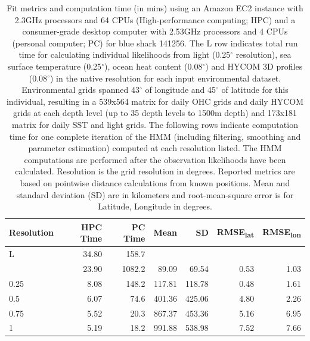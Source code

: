 \begin{table}
\caption[Model fit metrics, grid resolution and computation time]{Fit metrics and computation time (in mins) using an Amazon EC2 instance with 2.3GHz processors and 64 CPUs (High-performance computing; HPC) and a consumer-grade desktop computer with 2.53GHz processors and 4 CPUs (personal computer; PC) for blue shark 141256. The L row indicates total run time for calculating individual likelihoods from light (0.25$^{\circ}$ resolution), sea surface temperature (0.25$^{\circ}$), ocean heat content (0.08$^{\circ}$) and HYCOM 3D profiles (0.08$^{\circ}$) in the native resolution for each input environmental dataset. Environmental grids spanned 43$^{\circ}$ of longitude and 45$^{\circ}$ of latitude for this individual, resulting in a 539x564 matrix for daily OHC grids and daily HYCOM grids at each depth level (up to 35 depth levels to 1500m depth) and 173x181 matrix for daily SST and light grids. The following rows indicate computation time for one complete iteration of the HMM (including filtering, smoothing and parameter estimation) computed at each resolution listed. The HMM computations are performed after the observation likelihoods have been calculated. Resolution is the grid resolution in degrees. Reported metrics are based on pointwise distance calculations from known positions. Mean and standard deviation (SD) are in kilometers and root-mean-square error is for Latitude, Longitude in degrees.}

\label{tab:a1t2}
\centering
\begin{tabular}[t]{lrrrrrr}
\toprule
\textbf{Resolution} & \textbf{HPC Time} & \textbf{PC Time} & \textbf{Mean} & \textbf{SD} & \textbf{\texorpdfstring{RMSE\textsubscript{lat}}{RMSElat}
} & \textbf{\texorpdfstring{RMSE\textsubscript{lon}}{RMSElon}}\\
\midrule
L & 34.80 & 158.7 &  &  &  & \\
\addlinespace
0.08 & 23.90 & 1082.2 & 89.09 & 69.54 & 0.53 & 1.03\\
0.25 & 8.08 & 148.2 & 117.81 & 118.78 & 0.48 & 1.61\\
0.5 & 6.07 & 74.6 & 401.36 & 425.06 & 4.80 & 2.26\\
0.75 & 5.52 & 20.3 & 867.37 & 453.36 & 5.16 & 6.95\\
1 & 5.19 & 18.2 & 991.88 & 538.98 & 7.52 & 7.66\\
\bottomrule
\end{tabular}
\end{table}
